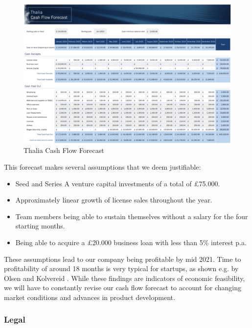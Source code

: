 \documentclass[main.tex]{subfiles}
\begin{document}
\begin{figure}[H]
    \caption{Thalia Cash Flow Forecast}
	\includegraphics[width=\textwidth]{03Requirements/03Pictures/cash_flow_forecast.png}
\end{figure}

This forecast makes several assumptions that we deem justifiable:

\begin{itemize}
    \item Seed and Series A venture capital investments of a total of £75.000.
    \item Approximately linear growth of license sales throughout the year.
    \item Team members being able to sustain themselves without a salary for the four starting months.
    \item Being able to acquire a £20.000 business loan with less than 5\% interest p.a.
\end{itemize}

These assumptions lead to our company being profitable by mid 2021. Time to profitability of around 18 months is very typical for startups, as shown e.g. by Olsen and Kolvereid \cite{startup_profitability}. While these findings are indicators of economic feasibility, we will have to constantly revise our cash flow forecast to account for changing market conditions and advances in product development.

\subsubsection{Legal}
\end{document}
